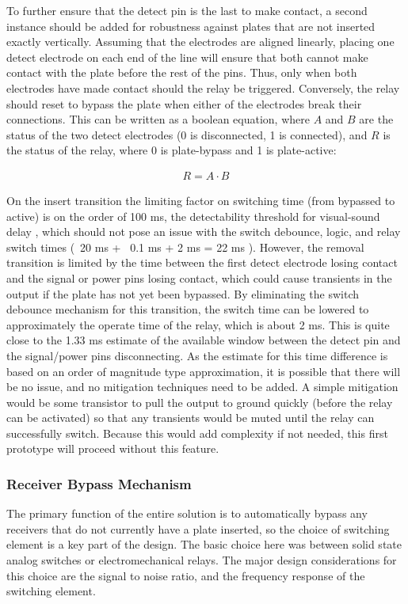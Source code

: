 \documentclass{article}
\begin{document}
		To further ensure that the detect pin is the last to make contact, a second instance should be added for robustness against plates that are not inserted exactly vertically.  Assuming that the electrodes are aligned linearly, placing one detect electrode on each end of the line will ensure that both cannot make contact with the plate before the rest of the pins.  Thus, only when both electrodes have made contact should the relay be triggered.  Conversely, the relay should reset to bypass the plate when either of the electrodes break their connections.  This can be written as a boolean equation, where $A$ and $B$ are the status of the two detect electrodes (0 is disconnected, 1 is connected), and $R$ is the status of the relay, where 0 is plate-bypass and 1 is plate-active:

		\begin{align}
			R = A \cdot B
		\end{align}

		On the insert transition the limiting factor on switching time (from bypassed to active) is on the order of 100 ms, the detectability threshold for visual-sound delay \cite{RelativeTime}, which should not pose an issue with the switch debounce, logic, and relay switch times (~20 ms + ~0.1 ms + 2 ms = 22 ms \cite{EA2datasheet}).  However, the removal transition is limited by the time between the first detect electrode losing contact and the signal or power pins losing contact, which could cause transients in the output if the plate has not yet been bypassed.  By eliminating the switch debounce mechanism for this transition, the switch time can be lowered to approximately the operate time of the relay, which is about 2 ms.  This is quite close to the 1.33 ms estimate of the available window between the detect pin and the signal/power pins disconnecting.  As the estimate for this time difference is based on an order of magnitude type approximation, it is possible that there will be no issue, and no mitigation techniques need to be added.  A simple mitigation would be some transistor to pull the output to ground quickly (before the relay can be activated) so that any transients would be muted until the relay can successfully switch.  Because this would add complexity if not needed, this first prototype will proceed without this feature.

		\subsubsection{Receiver Bypass Mechanism}
		The primary function of the entire solution is to automatically bypass any receivers that do not currently have a plate inserted, so the choice of switching element is a key part of the design.  The basic choice here was between solid state analog switches or electromechanical relays.  The major design considerations for this choice are the signal to noise ratio, and the frequency response of the switching element.
\end{document}

